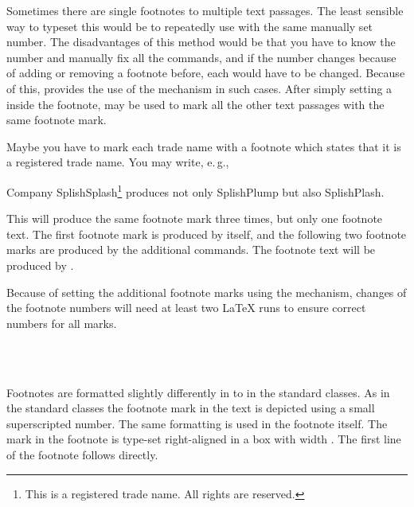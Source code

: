 \begin{Declaration}
\end{Declaration}
%
Sometimes there are single footnotes to
 multiple text passages. The least sensible way to typeset this would
be to repeatedly use  with the same manually set
number. The disadvantages of this method would be that you have to
know the number and manually fix all the 
commands, and if the number changes because of adding or removing a
footnote before, each  would have to be
changed. Because of this, \KOMAScript{} provides the use of the
 mechanism in
such cases. After simply setting a  inside the footnote,
 may be used to mark all the other text passages with
the same footnote mark.
\begin{Example}
  Maybe you have to mark each trade name with a footnote which states that it
  is a registered trade name. You may write, e.\,g.,
\begin{lstcode}
  Company SplishSplash\footnote{This is a registered trade name.
    All rights are reserved.\label{refnote}}
  produces not only SplishPlump
  but also SplishPlash.
\end{lstcode}
  This will produce the same footnote mark three times, but only one footnote
  text. The first footnote mark is produced by 
  itself, and the following two footnote marks are produced by
  the additional  commands. The footnote text will be produced by
  .  
\end{Example}
Because of setting the additional footnote marks using the 
mechanism, changes of the footnote numbers will need at least two \LaTeX{}
runs to ensure correct numbers for all  marks.%
%
%
\begin{Declaration}
                     \\
  \\
\end{Declaration}%
%
%
%
Footnotes are formatted slightly differently in {\KOMAScript} to in the
standard classes. As in the standard classes the footnote mark in the text is
depicted using a small superscripted number. The same formatting is used in
the footnote itself. The mark in the footnote is type-set right-aligned in a
box with width . The first line of the footnote follows
directly.

